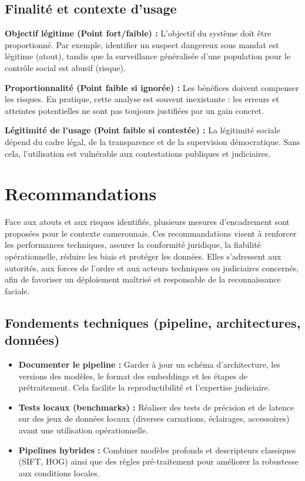 \documentclass[11pt,a4paper]{article}
\begin{document}
	\subsection{Finalité et contexte d’usage}
	\textbf{Objectif légitime (Point fort/faible) :} L’objectif du système doit être proportionné. Par exemple, identifier un suspect dangereux sous mandat est légitime (atout), tandis que la surveillance généralisée d’une population pour le contrôle social est abusif (risque).
	
	\textbf{Proportionnalité (Point faible si ignorée) :} Les bénéfices doivent compenser les risques. En pratique, cette analyse est souvent inexistante : les erreurs et atteintes potentielles ne sont pas toujours justifiées par un gain concret.
	
	\textbf{Légitimité de l’usage (Point faible si contestée) :} La légitimité sociale dépend du cadre légal, de la transparence et de la supervision démocratique. Sans cela, l’utilisation est vulnérable aux contestations publiques et judiciaires.
	
	\section{ Recommandations}
	\vspace{0.5cm}
	Face aux atouts et aux risques identifiés, plusieurs mesures d’encadrement sont proposées pour le contexte camerounais. Ces recommandations visent à renforcer les performances techniques, assurer la conformité juridique, la fiabilité opérationnelle, réduire les biais et protéger les données. Elles s’adressent aux autorités, aux forces de l’ordre et aux acteurs techniques ou judiciaires concernés, afin de favoriser un déploiement maîtrisé et responsable de la reconnaissance faciale.
	\vspace{0.5cm}
	\subsection{Fondements techniques (pipeline, architectures, données)}
	\begin{itemize}
		\item \textbf{Documenter le pipeline :} Garder à jour un schéma d’architecture, les versions des modèles, le format des embeddings et les étapes de prétraitement. Cela facilite la reproductibilité et l’expertise judiciaire.
		\item \textbf{Tests locaux (benchmarks) :} Réaliser des tests de précision et de latence sur des jeux de données locaux (diverses carnations, éclairages, accessoires) avant une utilisation opérationnelle.
		\item \textbf{Pipelines hybrides :} Combiner modèles profonds et descripteurs classiques (SIFT, HOG) ainsi que des règles pré-traitement pour améliorer la robustesse aux conditions locales.
	\end{itemize}
	\vspace{0.5cm}
\end{document}
